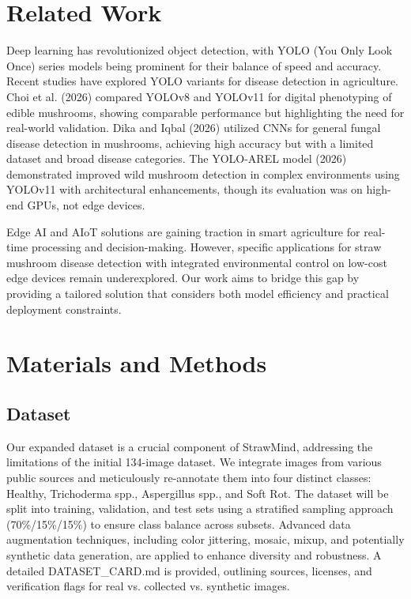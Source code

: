\documentclass[journal]{IEEEtran}
\begin{document}
\section{Related Work}

Deep learning has revolutionized object detection, with YOLO (You Only Look Once) series models being prominent for their balance of speed and accuracy. Recent studies have explored YOLO variants for disease detection in agriculture. Choi et al. (2026) \cite{choi2026comparative} compared YOLOv8 and YOLOv11 for digital phenotyping of edible mushrooms, showing comparable performance but highlighting the need for real-world validation. Dika and Iqbal (2026) \cite{dika2026fungal} utilized CNNs for general fungal disease detection in mushrooms, achieving high accuracy but with a limited dataset and broad disease categories. The YOLO-AREL model (2026) \cite{yoloarel2026lightweight} demonstrated improved wild mushroom detection in complex environments using YOLOv11 with architectural enhancements, though its evaluation was on high-end GPUs, not edge devices.

Edge AI and AIoT solutions are gaining traction in smart agriculture for real-time processing and decision-making. However, specific applications for straw mushroom disease detection with integrated environmental control on low-cost edge devices remain underexplored. Our work aims to bridge this gap by providing a tailored solution that considers both model efficiency and practical deployment constraints.

\section{Materials and Methods}

\subsection{Dataset}
Our expanded dataset is a crucial component of StrawMind, addressing the limitations of the initial 134-image dataset. We integrate images from various public sources \cite{mendeley2025mushroom, kaggle2023mushroom, roboflow2024mushroom, mendeley2025cauliflower, strawmind2024original} and meticulously re-annotate them into four distinct classes: Healthy, Trichoderma spp., Aspergillus spp., and Soft Rot. The dataset will be split into training, validation, and test sets using a stratified sampling approach (70\%/15\%/15\%) to ensure class balance across subsets. Advanced data augmentation techniques, including color jittering, mosaic, mixup, and potentially synthetic data generation, are applied to enhance diversity and robustness. A detailed DATASET\_CARD.md is provided, outlining sources, licenses, and verification flags for real vs. collected vs. synthetic images.
\end{document}
